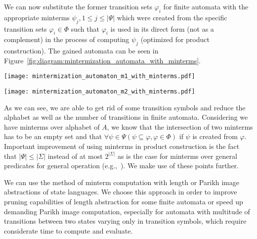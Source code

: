 We can now substitute the former transition sets $\varphi_i$ for finite automata with the appropriate minterms $\psi_j, 1 \leq j \leq |\Psi|$ which were created from the specific transition sets $\varphi_i \in \Phi$ such that $\varphi_i$ is used in its direct form (not as a complement) in the process of computing $\psi_j$ (optimized for product construction). The gained automata can be seen in Figure~\ref{fig:diagram:mintermization_automata_with_minterms}.

\begin{figure*}[ht]
    \centering
    \begin{minipage}{0.47\linewidth}
        \centering
        \texttt{[image: mintermization\_automaton\_m1\_with\_minterms.pdf]}
        \caption{Finite automaton $A_1$ with transitions substituted by corresponding minterms $\psi_i \in \Psi$ created from these transition sets.}
        \label{fig:diagram:mintermization_automaton_m1_with_minterms}
    \end{minipage}
    \hfill
    \begin{minipage}{0.47\linewidth}
        \centering
        \texttt{[image: mintermization\_automaton\_m2\_with\_minterms.pdf]}
        \caption{Finite automaton $A_2$ with transitions substituted by corresponding minterms $\psi_i \in \Psi$ created from these transition sets.}
        \label{fig:diagram:mintermization_automaton_m2_with_minterms}
    \end{minipage}
    \vspace{0.5cm}
    \caption{Finite automata $A_1$ and $A_2$ with substituted transitions with minterms in the process of mintermization.}
    \label{fig:diagram:mintermization_automata_with_minterms}
\end{figure*}

As we can see, we are able to get rid of some transition symbols and reduce the alphabet as well as the number of transitions in finite automata. Considering we have minterms over alphabet of $A$, we know that the intersection of two minterms has to be an empty set and that $\forall \psi \in \Psi ( \psi \subseteq \varphi, \varphi \in \Phi )$ if $\psi$ is created from $\varphi$. Important improvement of using minterms in product construction is the fact that $|\Psi| \leq |\Sigma|$ instead of at most $2^{|\Sigma|}$ as is the case for minterms over general predicates for general operation (e.g.,~\cite{minterms_forms-FITPUB11801}). We make use of these points further.

We can use the method of minterm computation with length or Parikh image abstractions of state languages. We choose this approach in order to improve pruning capabilities of length abstraction for some finite automata or speed up demanding Parikh image computation, especially for automata with multitude of transitions between two states varying only in transition symbols, which require considerate time to compute and evaluate.

